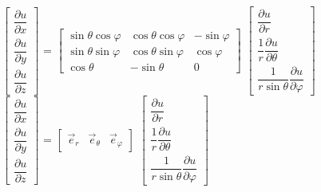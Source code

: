 	\small {$
		\left[\begin{array}{ccc}
			\dfrac{\partial u}{\partial x} \\
			\dfrac{\partial u}{\partial y} \\
			\dfrac{\partial u}{\partial z}
		\end{array}\right]$
		=
		$\left[\begin{array}{ccc}
			\sin \theta \cos \varphi & \cos \theta \cos \varphi & -\sin \varphi \\
			\sin \theta \sin \varphi &  \cos \theta \sin \varphi &  \cos \varphi \\
			\cos \theta & -\sin \theta & 0
		\end{array}\right]$
		$\left[\begin{array}{ccc}
			\dfrac{\partial u}{\partial r} \\
			\dfrac{1}{r}\dfrac{\partial u}{\partial \theta} \\
			\dfrac{1}{r \sin \theta}\dfrac{\partial u}{\partial \varphi}
		\end{array}\right]
		$}	\\ \vspace{0.3cm}
	\small {$
		\left[\begin{array}{ccc}
			\dfrac{\partial u}{\partial x} \\
			\dfrac{\partial u}{\partial y} \\
			\dfrac{\partial u}{\partial z}
		\end{array}\right]$
		=
		$\left[\begin{array}{ccc}
			{\vec{e}_r}&  {\vec{e}_\theta} & {\vec{e}_\varphi}
		\end{array}\right]$
		$\left[\begin{array}{ccc}
			\dfrac{\partial u}{\partial r} \\
			\dfrac{1}{r}\dfrac{\partial u}{\partial \theta} \\
			\dfrac{1}{r \sin \theta}\dfrac{\partial u}{\partial \varphi}
		\end{array}\right]
		$}	\\ 
	


